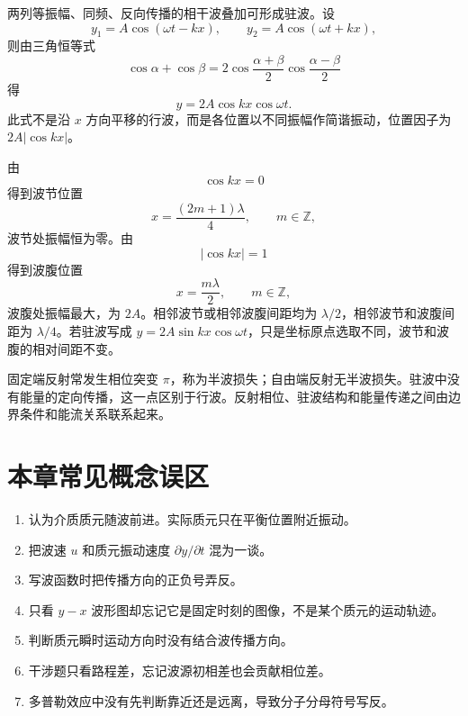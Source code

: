\begin{theorem}[驻波的形成]\label{thm:standing-wave-note}
两列等振幅、同频、反向传播的相干波叠加可形成驻波。设
\[
  y_1=A\cos(\omega t-kx),\qquad
  y_2=A\cos(\omega t+kx),
\]
则由三角恒等式
\[
  \cos\alpha+\cos\beta
  =2\cos\frac{\alpha+\beta}{2}\cos\frac{\alpha-\beta}{2}
\]
得
\[
  y=2A\cos kx\cos\omega t.
\]
此式不是沿 $x$ 方向平移的行波，而是各位置以不同振幅作简谐振动，位置因子为 $2A|\cos kx|$。
\end{theorem}

由
\[
  \cos kx=0
\]
得到波节位置
\[
  x=\frac{(2m+1)\lambda}{4},\qquad m\in\mathbb Z,
\]
波节处振幅恒为零。由
\[
  |\cos kx|=1
\]
得到波腹位置
\[
  x=\frac{m\lambda}{2},\qquad m\in\mathbb Z,
\]
波腹处振幅最大，为 $2A$。相邻波节或相邻波腹间距均为 $\lambda/2$，相邻波节和波腹间距为 $\lambda/4$。若驻波写成 $y=2A\sin kx\cos\omega t$，只是坐标原点选取不同，波节和波腹的相对间距不变。

\begin{attention}[反射与半波损失]
固定端反射常发生相位突变 $\pi$，称为半波损失；自由端反射无半波损失。驻波中没有能量的定向传播，这一点区别于行波。反射相位、驻波结构和能量传递之间由边界条件和能流关系联系起来。
\end{attention}

\section*{本章常见概念误区}

\begin{pitfall}[机械波常见错误]
\begin{enumerate}
  \item 认为介质质元随波前进。实际质元只在平衡位置附近振动。
  \item 把波速 $u$ 和质元振动速度 $\partial y/\partial t$ 混为一谈。
  \item 写波函数时把传播方向的正负号弄反。
  \item 只看 $y-x$ 波形图却忘记它是固定时刻的图像，不是某个质元的运动轨迹。
  \item 判断质元瞬时运动方向时没有结合波传播方向。
  \item 干涉题只看路程差，忘记波源初相差也会贡献相位差。
  \item 多普勒效应中没有先判断靠近还是远离，导致分子分母符号写反。
\end{enumerate}
\end{pitfall}
